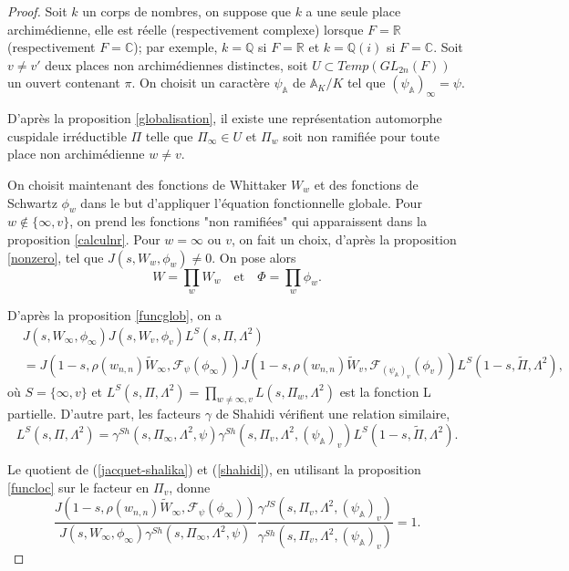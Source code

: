\documentclass{amsart}
\begin{document}
 \begin{proof}
 Soit $k$ un corps de nombres, on suppose que $k$ a une seule place archimédienne, elle est réelle (respectivement complexe) lorsque $F=\mathbb{R}$ (respectivement $F=\mathbb{C}$); par exemple, $k=\mathbb{Q}$ si $F=\mathbb{R}$ et $k=\mathbb{Q}(i)$ si $F=\mathbb{C}$. Soit $v \neq v'$ deux places non archimédiennes distinctes, soit $U \subset Temp(GL_{2n}(F))$ un ouvert contenant $\pi$. On choisit un caractère $\psi_\mathbb{A}$ de $\mathbb{A}_K/K$ tel que $(\psi_\mathbb{A})_\infty = \psi$.
 
 D'après la proposition \ref{globalisation}, il existe une représentation automorphe cuspidale irréductible $\Pi$ telle que $\Pi_{\infty} \in U$ et $\Pi_w$ soit non ramifiée pour toute place non archimédienne $w \neq v$.
 
 On choisit maintenant des fonctions de Whittaker $W_w$ et des fonctions de Schwartz $\phi_w$ dans le but d'appliquer l'équation fonctionnelle globale. Pour $w \not\in \{\infty, v\}$, on prend les fonctions "non ramifiées" qui apparaissent dans la proposition \ref{calculnr}. Pour $w = \infty$ ou $v$, on fait un choix, d'après la proposition \ref{nonzero}, tel que $J(s, W_w, \phi_w) \neq 0$. On pose alors
 $$W = \prod_w W_w \quad \text{et} \quad \Phi  = \prod_w \phi_w.$$
 
 D'après la proposition \ref{funcglob}, on a
 \begin{equation}
 \label{jacquet-shalika}
 \begin{split}
 &J(s, W_\infty, \phi_\infty)J(s, W_v, \phi_v)L^S(s, \Pi, \Lambda^2) \\
 &= J(1-s, \rho(w_{n,n})\tilde{W}_\infty, \mathcal{F}_\psi(\phi_\infty))J(1-s, \rho(w_{n,n})\tilde{W}_v, \mathcal{F}_{(\psi_\mathbb{A})_v}(\phi_v))L^S(1-s, \tilde{\Pi}, \Lambda^2),
 \end{split}
 \end{equation}
 où $S = \{\infty, v\}$ et $L^S(s, \Pi, \Lambda^2) = \prod_{w \neq \infty,v} L(s, \Pi_w, \Lambda^2)$ est la fonction L partielle. D'autre part, les facteurs $\gamma$ de Shahidi vérifient une relation similaire,
 \begin{equation}
 \label{shahidi}
 L^S(s, \Pi, \Lambda^2) = \gamma^{Sh}(s, \Pi_\infty, \Lambda^2, \psi)\gamma^{Sh}(s, \Pi_v, \Lambda^2, (\psi_\mathbb{A})_v)L^S(1-s, \tilde{\Pi}, \Lambda^2).
 \end{equation}
 
 Le quotient de (\ref{jacquet-shalika}) et (\ref{shahidi}), en utilisant la proposition \ref{funcloc} sur le facteur en $\Pi_v$, donne
 \begin{equation}
 \frac{J(1-s, \rho(w_{n,n})\tilde{W}_\infty, \mathcal{F}_\psi(\phi_\infty))}{J(s, W_\infty, \phi_\infty)\gamma^{Sh}(s, \Pi_\infty, \Lambda^2, \psi)} \frac{\gamma^{JS}(s, \Pi_v, \Lambda^2, (\psi_\mathbb{A})_v)}{\gamma^{Sh}(s, \Pi_v, \Lambda^2, (\psi_\mathbb{A})_v)} = 1.
 \end{equation}
 

\end{proof}
\end{document}
